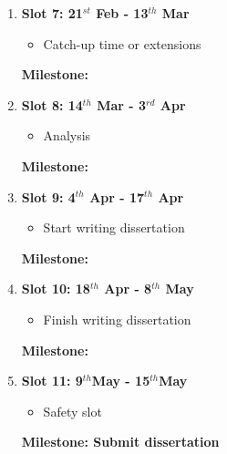 \begin{enumerate}
\begin{itemize}
		\item Debug and test
	\end{itemize}
	{\bf Milestone: write and pass tests} 
\item {\bf Slot 7: 21$^{st}$ Feb - 13$^{th}$ Mar}
	\begin{itemize}
		\item Catch-up time or extensions
	\end{itemize}
	{\bf Milestone:} 
\item {\bf Slot 8: 14$^{th}$ Mar - 3$^{rd}$ Apr}
	\begin{itemize}
		\item Analysis
	\end{itemize}
	{\bf Milestone:} 
\item {\bf Slot 9: 4$^{th}$ Apr - 17$^{th}$ Apr}
	\begin{itemize}
		\item Start writing dissertation
	\end{itemize}
	{\bf Milestone:}
\item {\bf Slot 10: 18$^{th}$ Apr - 8$^{th}$ May}
	\begin{itemize}
		\item Finish writing dissertation
	\end{itemize}
	{\bf Milestone:}	 
\item {\bf Slot 11: 9$^{th}$May  - 15$^{th}$May}
	\begin{itemize}
		\item Safety slot
	\end{itemize}
	{\bf Milestone: Submit dissertation} 
\end{enumerate}



 


